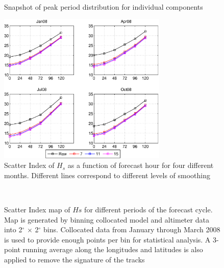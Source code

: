 \documentclass[12pt]{article}
\newcommand{\degree}{^\circ}
\begin{document}
\begin{figure}[t]
\hspace*{0.5in}
\\
\hspace*{0.5in}
\caption{Snapshot of peak period distribution for individual components}
\label{fig:tp_part}
\end{figure}

\begin{figure}[t]
\noindent\includegraphics[width=19pc]{./figures/glo_30m_sih_comp.eps}
\caption{Scatter Index of $H_s$ as a function of forecast hour for four different months. Different lines correspond to different levels of smoothing}
\label{fig:sih_global}
\end{figure}

\setcounter{subfigure}{0}
\begin{figure}[t] 
\hspace*{0.25in}
 \\
\hspace*{0.25in}
\caption{Scatter Index map of $Hs$ for different periods of the forecast cycle. Map is generated by binning collocated model and altimeter data into 2$\degree$ $\times$ 2$\degree$ bins. Collocated data from January through March 2008 is used to provide enough points per bin for statistical analysis. A 3-point running average along the longitudes and latitudes is also applied to remove the signature of the tracks}
\label{fig:SI_map}
\end{figure}
\end{document}
